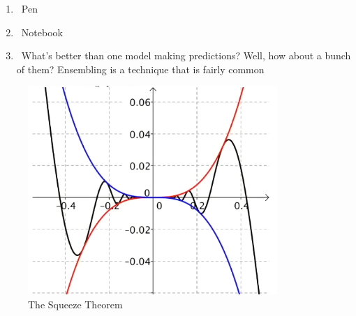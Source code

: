 \documentclass[11pt, a4paper]{article}
\newcommand{\calculator}{\faCalculator}
\begin{document}
\begin{enumerate}
    \item \faPen\ Pen
    \item \faEdit\ Notebook
    \item \calculator\ What’s	better	than	one	model	making	predictions?	Well,	how	about	a	bunch	of
 them?	Ensembling	is	a	technique	that	is	fairly	common
\end{enumerate}

\begin{figure}[H]
    \centering
    \includegraphics[scale=1]{limit2.png}
    \caption{The Squeeze Theorem}
\end{figure}
\end{document}
